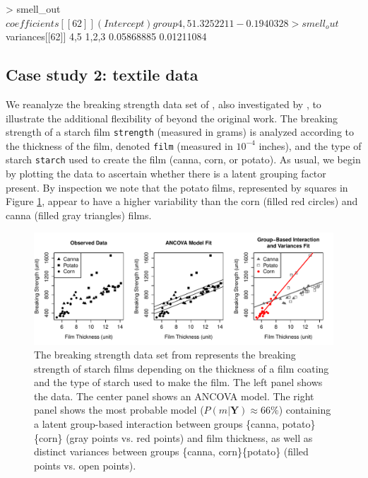 \begin{example}
> smell_out$coefficients[[62]]
(Intercept)  group{4,5} 
  1.3252211  -0.1940328
> smell_out$variances[[62]]
     {4,5}    {1,2,3} 
0.05868885 0.01211084
\end{example}

\subsection{Case study 2: textile data}\hypertarget{subsection:textile}{}

We reanalyze the breaking strength data set of \citet{Furry}, also investigated by \citet{technometrics_paper}, to illustrate the additional flexibility of  beyond the original work. The breaking strength of a starch film \texttt{strength} (measured in grams) is analyzed according to the thickness of the film, denoted \texttt{film} (measured in $10^{-4}$ inches), and the type of starch \texttt{starch} used to create the film (canna, corn, or potato). As usual, we begin by plotting the data to ascertain whether there is a latent grouping factor present. By inspection we note that the potato films, represented by squares in Figure \ref{figure:chips}, appear to have a higher variability than the corn (filled red circles) and canna (filled gray triangles) films. 

\begin{figure}[htbp]
  \centering
  \includegraphics[width=5in]{figures/chipsthree.pdf}
  \caption{The breaking strength data set from \citet{Furry} represents the breaking strength of starch films depending on the thickness of a film coating and the type of starch used to make the film. The left panel shows the data. The center panel shows an ANCOVA model. The right panel shows the most probable model ($P(m|\boldsymbol{Y})\approx 66\%$) containing a latent group-based interaction between groups \{canna, potato\}\{corn\} (gray points vs. red points) and film thickness, as well as distinct variances between groups \{canna, corn\}\{potato\} (filled points vs. open points).}
  \label{figure:chips}
\end{figure}

